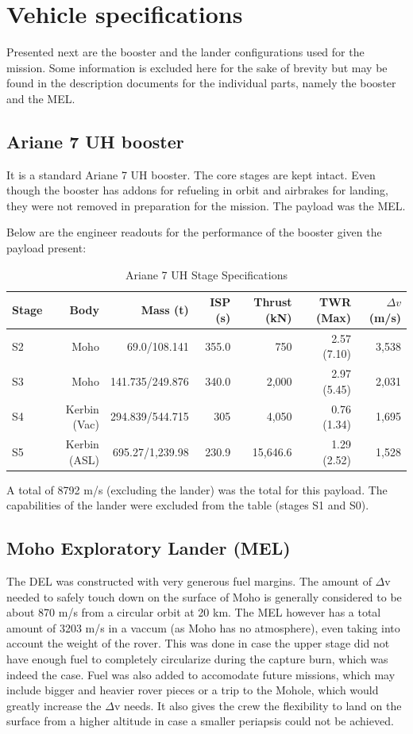 \documentclass[11pt, a4paper]{article}
\begin{document}
\section{Vehicle specifications}
Presented next are the booster and the lander configurations used for
the mission. Some information is excluded here for the sake of brevity
but may be found in the description documents for the individual
parts, namely the booster and the MEL.

\subsection{Ariane 7 UH booster}
It is a standard Ariane 7 UH booster. The core stages are kept
intact. Even though the booster has addons for refueling in orbit and
airbrakes for landing, they were not removed in preparation for the
mission. The payload was the MEL.

Below are the engineer readouts for the performance of the booster
given the payload present:
\begin{table}[h]
  \centering
  \caption{Ariane 7 UH Stage Specifications}
  \vspace{2mm}
  \begin{tabular}{l r r r r r r}
    \toprule
    \textbf{Stage} & \textbf{Body} & \textbf{Mass (t)} & \textbf{ISP (s)} & \textbf{Thrust (kN)} & \textbf{TWR (Max)} & \textbf{$\Delta v$ (m/s)}\\ 
    \midrule
    S2 & Moho & 69.0/108.141 & 355.0 & 750 & 2.57 (7.10) & 3,538 \\
    S3 & Moho & 141.735/249.876 & 340.0 & 2,000 & 2.97 (5.45) & 2,031 \\
    S4 & Kerbin (Vac) & 294.839/544.715 & 305 & 4,050 & 0.76 (1.34) & 1,695 \\
    S5 & Kerbin (ASL) & 695.27/1,239.98 & 230.9 & 15,646.6 & 1.29 (2.52) & 1,528 \\ 
    \bottomrule
  \end{tabular}
\end{table}

A total of 8792 m/s (excluding the lander) was the total for this
payload. The capabilities of the lander were excluded from the table (stages S1
and S0).

\subsection{Moho Exploratory Lander (MEL)}
The DEL was constructed with very generous fuel margins. The amount of
$\Delta$v needed to safely touch down on the surface of Moho is
generally considered to be about 870 m/s from a circular orbit at 20
km. The MEL however has a total amount of 3203 m/s in a vaccum (as
Moho has no atmosphere), even taking into account the weight of the
rover. This was done in case the upper stage did not have enough fuel
to completely circularize during the capture burn, which was indeed
the case. Fuel was also added to accomodate future missions, which may
include bigger and heavier rover pieces or a trip to the Mohole, which
would greatly increase the $\Delta$v needs. It also gives the crew the
flexibility to land on the surface from a higher altitude in case a
smaller periapsis could not be achieved.
\end{document}
